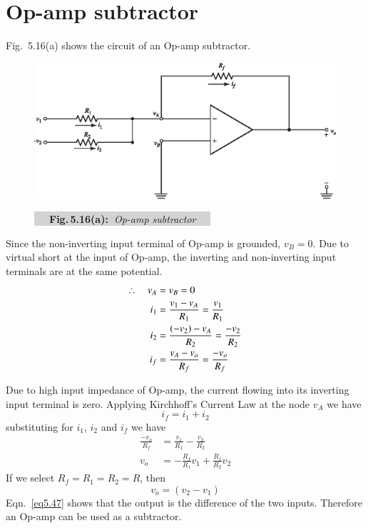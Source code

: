 \section{Op-amp subtractor}\label{sec5.15}

Fig.~5.16(a) shows the circuit of an Op-amp subtractor.
\begin{figure}[H]
\centering
\includegraphics{chap4/S3-EE-06-024.eps}

\medskip
\centerline{\colorbox{lightgray}{~~~{\bf Fig.\,5.16(a):~}{\em Op-amp subtractor}~~~}}
\end{figure}

\eject

Since the non-inverting input terminal of Op-amp is grounded, $v_{B}=0$. Due to virtual short at the input of Op-amp, the inverting and non-inverting input terminals are at the same potential.
\begin{align}
\therefore\quad v_{A} &= v_{B}=0\notag\\
i_{1} &= \frac{v_{1}-v_{A}}{R_{1}}=\frac{v_{1}}{R_{1}}\label{eq5.43}\\
i_{2} &= \frac{(-v_{2})-v_{A}}{R_{2}}=\frac{-v_{2}}{R_{2}}\label{eq5.44}\\
i_{f} &= \frac{v_{A}-v_{o}}{R_{f}}=\frac{-v_{o}}{R_{f}}\label{eq5.45}
\end{align}


Due to high input impedance of Op-amp, the current flowing into its inverting input terminal is zero. Applying Kirchhoff's Current Law at the node $v_{A}$ we have
\begin{equation}
i_{f}=i_{1}+i_{2}\label{eq5.46}
\end{equation}
substituting for $i_{1}$, $i_{2}$ and $i_{f}$ we have
\begin{align*}
\frac{-v_{o}}{R_{f}} &= \frac{v_{1}}{R_{1}}-\frac{v_{2}}{R_{2}}\\
v_{o} &= -\frac{R_{f}}{R_{1}}v_{1}+\frac{R_{f}}{R_{2}}v_{2}
\end{align*}
If we select $R_{f}=R_{1}=R_{2}=R$, then
\begin{equation}
v_{o}=(v_{2}-v_{1})\label{eq5.47}
\end{equation}
Eqn.~\eqref{eq5.47} shows that the output is the difference of the two inputs. Therefore an Op-amp can be used as a subtractor.


